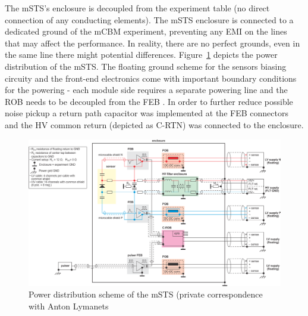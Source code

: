The \gls{mSTS}'s enclosure is decoupled from the experiment table (no direct connection of any conducting elements). The \gls{mSTS} enclosure is connected to a dedicated ground of the \gls{mCBM} experiment, preventing any \gls{EMI} on the lines that may affect the performance. In reality, there are no perfect grounds, even in the same line there might potential differences.  Figure~\ref{fig_msts_power} depicts the power distribution of the \gls{mSTS}. The floating ground scheme for the sensors biasing circuity and the front-end electronics come with important boundary conditions for the powering - each module side requires a separate powering line and the \gls{ROB} needs to be decoupled from the \gls{FEB} \cite{RodriguezRodriguez2020}. In order to further reduce possible noise pickup a return path capacitor was implemented at the \gls{FEB} connectors and the \gls{HV} common return (depicted as C-RTN) was connected to the enclosure.
\begin{figure}[!h]
\centering
\includegraphics[width=1\columnwidth]{Chapter6/DCS/images/power_distribution.png}
\caption{Power distribution scheme of the \gls{mSTS} (private correspondence with Anton Lymanets}
\label{fig_msts_power}
\end{figure}
\newpage
